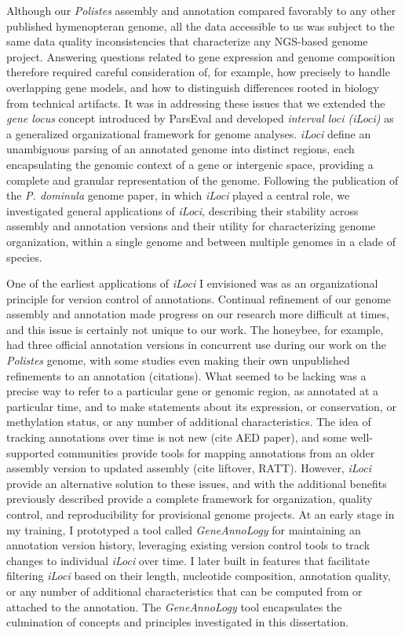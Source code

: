 Although our \textit{Polistes} assembly and annotation compared favorably to any other published hymenopteran genome, all the data accessible to us was subject to the same data quality inconsistencies that characterize any NGS-based genome project.
Answering questions related to gene expression and genome composition therefore required careful consideration of, for example, how precisely to handle overlapping gene models, and how to distinguish differences rooted in biology from technical artifacts.
It was in addressing these issues that we extended the \textit{gene locus} concept introduced by ParsEval and developed \textit{interval loci (iLoci)} as a generalized organizational framework for genome analyses.
\textit{iLoci} define an unambiguous parsing of an annotated genome into distinct regions, each encapsulating the genomic context of a gene or intergenic space, providing a complete and granular representation of the genome.
Following the publication of the \textit{P. dominula} genome paper, in which \textit{iLoci} played a central role, we investigated general applications of \textit{iLoci}, describing their stability across assembly and annotation versions and their utility for characterizing genome organization, within a single genome and between multiple genomes in a clade of species.

One of the earliest applications of \textit{iLoci} I envisioned was as an organizational principle for version control of annotations.
Continual refinement of our genome assembly and annotation made progress on our research more difficult at times, and this issue is certainly not unique to our work.
The honeybee, for example, had three official annotation versions in concurrent use during our work on the \textit{Polistes} genome, with some studies even making their own unpublished refinements to an annotation (citations).
What seemed to be lacking was a precise way to refer to a particular gene or genomic region, as annotated at a particular time, and to make statements about its expression, or conservation, or methylation status, or any number of additional characteristics.
The idea of tracking annotations over time is not new (cite AED paper), and some well-supported communities provide tools for mapping annotations from an older assembly version to updated assembly (cite liftover, RATT).
However, \textit{iLoci} provide an alternative solution to these issues, and with the additional benefits previously described provide a complete framework for organization, quality control, and reproducibility for provisional genome projects.
At an early stage in my training, I prototyped a tool called \textit{GeneAnnoLogy} for maintaining an annotation version history, leveraging existing version control tools to track changes to individual \textit{iLoci} over time.
I later built in features that facilitate filtering \textit{iLoci} based on their length, nucleotide composition, annotation quality, or any number of additional characteristics that can be computed from or attached to the annotation.
The \textit{GeneAnnoLogy} tool encapsulates the culmination of concepts and principles investigated in this dissertation.

